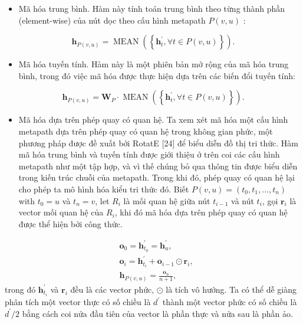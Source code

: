 \begin{itemize}
  \item Mã hóa trung bình. Hàm này tính toán trung bình theo từng thành phần (element-wise) của nút dọc theo cấu hình metapath $P(v, u)$ :
\end{itemize}
\begin{equation}
  \mathbf{h}_{P(v, u)}=\operatorname{MEAN}\left(\left\{\mathbf{h}_{t}^{\prime}, \forall t \in P(v, u)\right\}\right).
\end{equation}

\begin{itemize}
  \item Mã hóa tuyến tính. Hàm này là một phiên bản mở rộng của mã hóa trung bình, trong đó việc mã hóa được thực hiện dựa trên các biến đổi tuyến tính:
\end{itemize}
\begin{equation}
    \mathbf{h}_{P(v, u)}=\mathbf{W}_{P} \cdot \operatorname{MEAN}\left(\left\{\mathbf{h}_{t}^{\prime}, \forall t \in P(v, u)\right\}\right).
\end{equation}

\begin{itemize}
  \item Mã hóa dựa trên phép quay có quan hệ. Ta xem xét mã hóa một cấu hình metapath dựa trên phép quay có quan hệ trong không gian phức, một phương pháp được đề xuất bởi RotatE [24] để biểu diễn đồ thị tri thức. Hàm mã hóa trung bình và tuyến tính được giới thiệu ở trên coi các cấu hình metapath như một tập hợp, và vì thế chúng bỏ qua thông tin được biểu diễn trong kiến trúc chuỗi của metapath. Trong khi đó, phép quay có quan hệ lại cho phép ta mô hình hóa kiểu tri thức đó. Biết $P(v, u)=\left(t_{0}, t_{1}, \ldots, t_{n}\right)$ with $t_{0}=u$ và $t_{n}=v$, let $R_{i}$ là mối quan hệ giữa nút  $t_{i-1}$ và nút $t_{i}$, gọi $\mathbf{r}_{i}$ là vector mối quan hệ của $R_{i}$, khi đó mã hóa dựa trên phép quay có quan hệ được thể hiện bởi công thức.
\end{itemize}
\begin{equation}
    \begin{aligned}
    & \mathbf{o}_{0}=\mathbf{h}_{t_{0}}^{\prime}=\mathbf{h}_{u}^{\prime}, \\
    & \mathbf{o}_{i}=\mathbf{h}_{t_{i}}^{\prime}+\mathbf{o}_{i-1} \odot \mathbf{r}_{i}, \\
    & \mathbf{h}_{P(v, u)}=\frac{\mathbf{o}_{n}}{n+1},
    \end{aligned}
\end{equation}
trong đó  $\mathbf{h}_{t_{i}}^{\prime}$ và $\mathbf{r}_{i}$ đều là các vector phức, $\odot$ là tích vô hướng. Ta có thể dễ giàng phân tích một vector thực có số chiều là $d^{\prime}$ thành một vector phức có số chiều là $d^{\prime} / 2$ bằng cách coi nửa đầu tiên của vector là phần thực và nửa sau là phần ảo.

